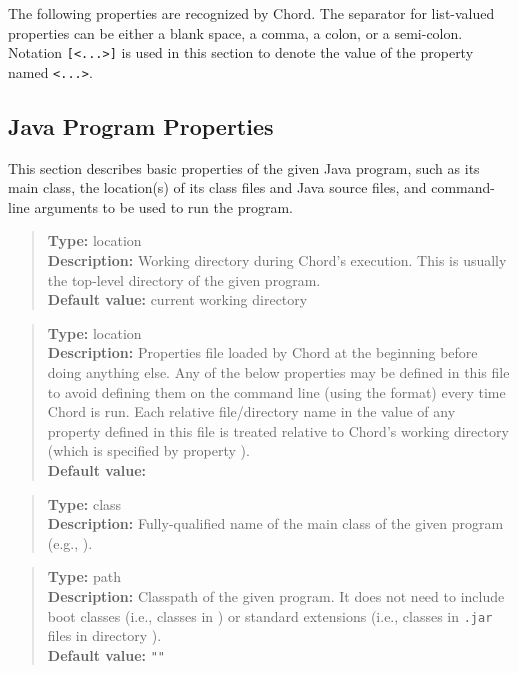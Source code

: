 The following properties are recognized by Chord.
The separator for list-valued properties can be either a blank space, a comma, a colon, or a semi-colon.
Notation {\tt [<...>]} is used in this section to denote the value of the property named {\tt <...>}.

\subsection{Java Program Properties} 
\label{sec:program-props}

This section describes basic properties of the given Java program, such as
its main class, the location(s) of its class files and Java source
files, and command-line arguments to be used to run the program.
\\[10pt]

\begin{quote}
{\bf Type:} location \\
{\bf Description:} Working directory during Chord's execution.  This is
usually the top-level directory of the given program. \\
{\bf Default value:} current working directory
\end{quote}

\begin{quote}
{\bf Type:} location \\
{\bf Description:} Properties file loaded by Chord at the
beginning before doing anything else.  Any of the below properties may
be defined in this file to avoid defining them on the command line
(using the  format) every time Chord is run.
Each relative file/directory name in the value of any property defined
in this file is treated relative to Chord's working directory (which
is specified by property ). \\
{\bf Default value:} 
\end{quote}

\begin{quote}
{\bf Type:} class \\
{\bf Description:} Fully-qualified name of the main class of the given program (e.g., ).
\end{quote}

\begin{quote}
{\bf Type:} path \\
{\bf Description:} Classpath of the given program.  It does not need to include
boot classes (i.e., classes in ) or
standard extensions (i.e., classes in {\tt .jar} files in directory
). \\
{\bf Default value:} {\tt ""}
\end{quote}


